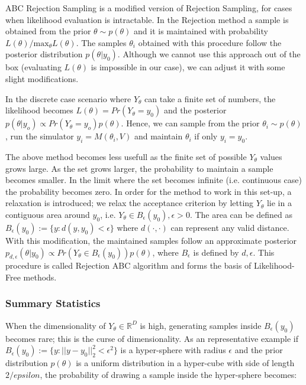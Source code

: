 \documentclass[11pt,twoside]{article}
\numberwithin{Theorem}{section}
\numberwithin{Definition}{section}
\numberwithin{Lemma}{section}
\numberwithin{Algorithm}{section}
\numberwithin{equation}{section}
\begin{document}
ABC Rejection Sampling is a modified version of Rejection Sampling, for cases when likelihood evaluation is intractable. In the Rejection  method a sample is obtained from the prior $\theta \sim p(\theta)$ and it is maintained with probability $L(\theta)/\text{max}_\theta L(\theta)$. The samples $\theta_i$ obtained with this procedure follow the posterior distribution $p(\theta|y_0)$. Although we cannot use this approach out of the box (evaluating $L(\theta)$ is impossible in our case), we can adjust it with some slight modifications.

In the discrete case scenario where $Y_\theta$ can take a finite set of numbers, the likelihood becomes $L(\theta) = Pr(Y_\theta=y_0)$ and the posterior $p(\theta|y_o) \propto Pr(Y_\theta=y_o)p(\theta)$. Hence, we can sample from the prior $\theta_i \sim p(\theta)$, run the simulator $y_i = M(\theta_i, V)$ and maintain $\theta_i$ if only $y_i = y_0$.

The above method becomes less usefull as the finite set of possible $Y_\theta$ values grows large. As the set grows larger, the probability to maintain a sample becomes smaller. In the limit where the set becomes infinite (i.e. continuous case) the probability becomes zero. In order for the method to work in this set-up, a relaxation is introduced; we relax the acceptance criterion by letting $Y_\theta$ lie in a contiguous area around $y_0$, i.e. $Y_\theta \in B_\epsilon(y_0), \epsilon > 0$. The area can be defined as $B_\epsilon(y_0) := \{y: d(y, y_0) < \epsilon \}$ where $d(\cdot, \cdot)$ can represent any valid distance. With this modification, the maintained samples follow an approximate posterior $p_{d,\epsilon}(\theta|y_0) \propto Pr(Y_\theta \in B_\epsilon(y_0))p(\theta)$, where $B_\epsilon$ is defined by $d, \epsilon$. This procedure is called Rejection ABC algorithm and forms the basis of Likelihood-Free methods.

\subsubsection{Summary Statistics}

When the dimensionality of $Y_\theta \in \mathbb{R}^D$ is high, generating samples inside $B_\epsilon(y_0)$ becomes rare; this is the curse of dimensionality. As an representative example if $B_\epsilon(y_0) := \{ y: ||y - y_0||_2^2 < \epsilon^2 \}$ is a hyper-sphere with radius $\epsilon$ and the prior distribution $p(\theta)$ is a uniform distribution in a hyper-cube with side of length $2/epsilon$, the probability of drawing a sample inside the hyper-sphere becomes:
\end{document}
